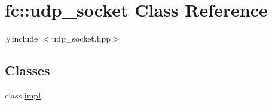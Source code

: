 \hypertarget{classfc_1_1udp__socket}{}\section{fc\+:\+:udp\+\_\+socket Class Reference}
\label{classfc_1_1udp__socket}


{\ttfamily \#include $<$udp\+\_\+socket.\+hpp$>$}

\subsection*{Classes}
\begin{DoxyCompactItemize}
\item 
class \mbox{\hyperlink{classfc_1_1udp__socket_1_1impl}{impl}}
\end{DoxyCompactItemize}
